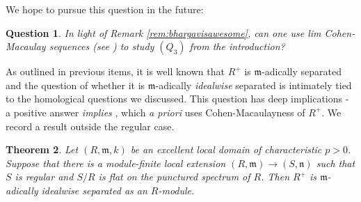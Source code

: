 \documentclass[12pt,reqno]{amsart}
\newtheorem{theorem}{Theorem}[section]
\newtheorem{question}[theorem]{Question}
\theoremstyle{definition}
\theoremstyle{remark}
\theoremstyle{cited}
\theoremstyle{remark}
\theoremstyle{citeddef}
\newcommand{\fm}{\mathfrak{m}}
\newcommand{\fn}{\mathfrak{n}}
\begin{document}
	We hope to pursue this question in the future:
	
	\begin{question}
		In light of Remark \ref{rem:bhargavisawesome}, can one use \emph{lim Cohen-Macaulay sequences} (see \cite{BHM}) to study  $(Q_3)$ from the introduction?  
	\end{question}
	
	As outlined in previous items, it is well known that $R^{+}$ is $\fm$-adically separated and the question of whether it is $\fm$-adically \emph{idealwise} separated is intimately tied to the homological questions we discussed. This question has deep implications - a positive answer \textit{implies} \cite[Theorem 4.13]{bhatt2019Regular}, which \emph{a priori} uses Cohen-Macaulayness of $R^{+}$. We record a result outside the regular case.
	
	\begin{theorem}\label{thm:regular-cover-idealwise-separated}
		Let $(R,\fm,k)$ be an excellent local domain of characteristic $p>0$. Suppose
		that there is a module-finite local extension
		\(
		(R,\fm)\to(S,\fn)
		\)
		such that $S$ is regular and $S/R$ is flat on the punctured spectrum of $R$.
		Then $R^+$ is $\fm$-adically idealwise separated as an $R$-module.
	\end{theorem}
	
\end{document}
